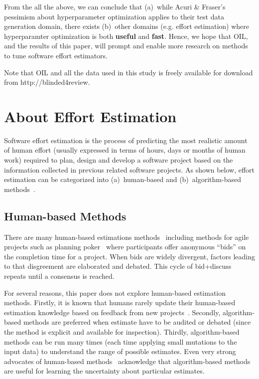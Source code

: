 From the all the above, we can conclude  that (a)~while   Acuri \& Fraser's pessimism about hyperparameter optimization  applies to their
test data generation domain, there exists (b)~other domains (e.g. effort estimation) where hyperparamter optimization is both {\bf useful} and {\bf fast}.
Hence, we hope that OIL, and the results of  this paper,  will prompt and enable   more research on   methods
to tune software effort estimators.

Note that OIL and all the data used in this study is freely available for download from http://blinded4review.

\section{About Effort Estimation}
\label{sec:1}
Software effort estimation is the process of predicting the most realistic amount of human effort (usually expressed in terms of hours, days or months of human work) required to plan, design and develop a software project based on the information collected in previous related software projects.
As shown below, effort estimation can be categorized into (a)~human-based and (b)~algorithm-based methods~\cite{teak2012,shepperd2007software}.

\subsection{Human-based Methods}
\label{sec:2}
There  are many human-based estimations methods~\cite{Jorgensen2004} including methods for agile projects such as planning poker~\cite{molokk08} where participants offer anonymous “bids” on the completion time for a project. When bids are widely divergent, factors leading to that disgreement are elaborated and debated. This cycle of bid+discuss repeats until a consensus
is reached.


For several reasons, this paper does not explore human-based  estimation methods.
Firstly,   it is known that humans rarely update their human-based estimation knowledge
based on feedback from new projects~\cite{jorgensen2009impact}.
Secondly, algorithm-based methods are preferred when   estimate have to be audited or debated
(since the  method is explicit and   available for inspection). 
Thirdly, algorithm-based methods can be run many times (each time applying small mutations to the input data)
to understand the range of possible estimates.
Even very strong
advocates of human-based methods~\cite{jorg2015a} acknowledge that algorithm-based methods are useful for learning
the
uncertainty
about particular estimates.


